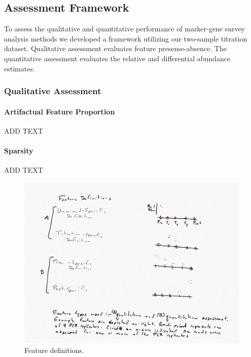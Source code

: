 \documentclass[linenumbers]{bmcart}
\begin{document}
\subsection*{Assessment Framework}
To assess the qualitative and quantitative performance of marker-gene survey analysis methods we developed a framework utilizing our two-sample titration dataset. Qualitative assessment evaluates feature presense-absence. The quantitative assessment evaluates the relative and differential abundance estimates.

\subsubsection*{Qualitative Assessment}
\paragraph{Artifactual Feature Proportion}
ADD TEXT

\paragraph{Sparsity}
ADD TEXT

\begin{figure}
\centering
\includegraphics{feature_definitions.png}
\caption{\label{fig:featureDefinitions} Feature definitions.}
\end{figure}
\end{document}
